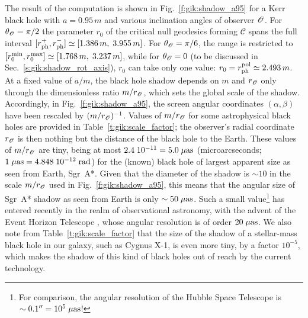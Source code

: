 The result of the computation is shown in
Fig.~\ref{f:gik:shadow_a95} for a Kerr black hole with
$a=0.95\, m$ and various inclination angles of observer $\mathscr{O}$.
For $\theta_{\mathscr{O}}=\pi/2$ the parameter $r_0$ of the critical null geodesics
forming $\mathscr{C}$ spans the full interval
$[r_{\rm ph}^+, r_{\rm ph}^-] \simeq [1.386\, m,\; 3.955\, m]$.
For $\theta_{\mathscr{O}}=\pi/6$, the range is restricted to
$[r_0^{\rm min}, r_0^{\rm max}] \simeq [1.768\, m,\;   3.237\, m]$,
while for $\theta_{\mathscr{O}}=0$ (to be discussed in Sec.~\ref{s:gik:shadow_rot_axis}),
$r_0$ can take only one value:
$r_0 = r_{\rm ph}^{\rm pol} \simeq 2.493\, m$.
At a fixed value of $a/m$, the black hole shadow depends on $m$ and $r_{\mathscr{O}}$
only through the dimensionless ratio $m/r_{\mathscr{O}}$, which sets the global scale of the shadow.
Accordingly, in Fig.~\ref{f:gik:shadow_a95}, the screen angular coordinates $(\alpha,\beta)$ have
been rescaled by $(m/r_{\mathscr{O}})^{-1}$.
Values of $m/r_{\mathscr{O}}$ for some astrophysical black holes are provided
in Table~\ref{t:gik:scale_factor}; the observer's radial coordinate $r_{\mathscr{O}}$ is then
nothing but the distance of the black hole to the Earth. These values of
$m/r_{\mathscr{O}}$ are tiny, being at most $2.4\; 10^{-11} = 5.0 \; \mu{\rm as}$
(microarcseconds; $1\; \mu{\rm as} = 4.848\; 10^{-12}\; {\rm rad}$)
for
the (known) black hole of largest apparent size as seen from Earth, Sgr~A*.
Given that the diameter of the shadow is $\sim 10$ in the scale
$m/r_{\mathscr{O}}$ used in Fig.~\ref{f:gik:shadow_a95}, this means that the
angular size of Sgr~A* shadow as seen from Earth is only $\sim 50\; \mu{\rm as}$.
Such a small value\footnote{For comparison, the angular resolution of the
Hubble Space Telescope is $\sim 0.1'' = 10^5\; \mu{\rm as}$!}
has entered recently in the realm of observational astronomy,
with the advent of the Event Horizon Telescope \cite{EHT19a,Wielg_al20},
whose angular resolution is of order $20\; \mu{\rm as}$.
We also note from Table~\ref{t:gik:scale_factor} that the size of the shadow
of a stellar-mass black hole in our galaxy, such as Cygnus X-1, is even more tiny,
by a factor $10^{-5}$, which makes the shadow of this kind of black holes out of reach
by the current technology.

